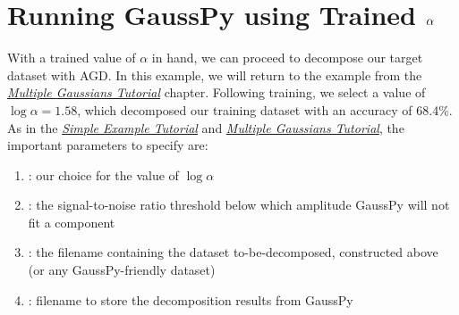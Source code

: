 \documentclass[letterpaper,10pt,openany,oneside]{sphinxmanual}
\begin{document}
\section{Running GaussPy using Trained \protect\(\alpha\protect\)}
\label{tutorial:running-gausspy-using-trained}
With a trained value of \(\alpha\) in hand, we can proceed to decompose our
target dataset with AGD. In this example, we will return to the example from the
{\hyperref[tutorial:multiple\string-gaussians\string-tutorial]{\emph{Multiple Gaussians Tutorial}}} chapter. Following training, we select a
value of \(\log\alpha=1.58\), which decomposed our training dataset with an
accuracy of 68.4\%. As in the {\hyperref[tutorial:simple\string-example\string-tutorial]{\emph{Simple Example Tutorial}}} and
{\hyperref[tutorial:multiple\string-gaussians\string-tutorial]{\emph{Multiple Gaussians Tutorial}}}, the important parameters to specify are:
\begin{enumerate}
\item {} 
: our choice for the value of \(\log\alpha\)

\item {} 
: the signal-to-noise ratio threshold below which amplitude
GaussPy will not fit a component

\item {} 
: the filename containing the dataset to-be-decomposed,
constructed above (or any GaussPy-friendly dataset)

\item {} 
: filename to store the decomposition results from
GaussPy

\end{enumerate}
\end{document}
